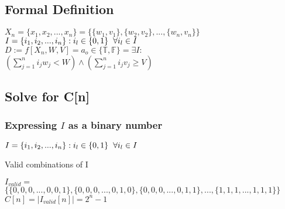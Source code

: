 \documentclass[11pt]{article}
\begin{document}
\subsection{Formal Definition}
\begin{center}
\vspace{8mm}
$
X_n = \{x_1,x_2,...,x_n\} = \{ \{w_1,v_1\},\{w_2,v_2\},...,\{w_n,v_n\} \}
$
\\ \vspace{8mm}
$
I = \{i_1,i_2,...,i_n\}: i_l \in \{0,1\} \hspace{2mm} \forall i_l \in I
$
\\ \vspace{8mm}
$
D := f[X_n,W,V] = a_o \in \{\mathbb{T},\mathbb{F}\} = \exists I:
$
\\ \vspace{2mm}
$
(\sum_{j=1}^n i_j w_j < W) \land (\sum_{j=1}^n i_j v_j \geq V)
$
\end{center}
\vspace{3mm}








\subsection{Solve for C[n]}

\subsubsection{Expressing $I$ as a binary number}
\vspace{4mm}
\begin{center}
$
I = \{i_1,i_2,...,i_n\}: i_l \in \{0,1\} \hspace{2mm} \forall i_l \in I
$
\end{center}
Valid combinations of I
\begin{center}
$
I_{valid} =
$
\\ \vspace{2mm}
$
\{ \{0,0,0,...,0,0,1\}, \{0,0,0,...,0,1,0\}, \{0,0,0,...,0,1,1\}, ... ,\{1,1,1,...,1,1,1\}\}
$
\\ \vspace{4mm}
$
C[n] = |I_{valid}[n]| = 2^n - 1
$
\end{center}
\end{document}
